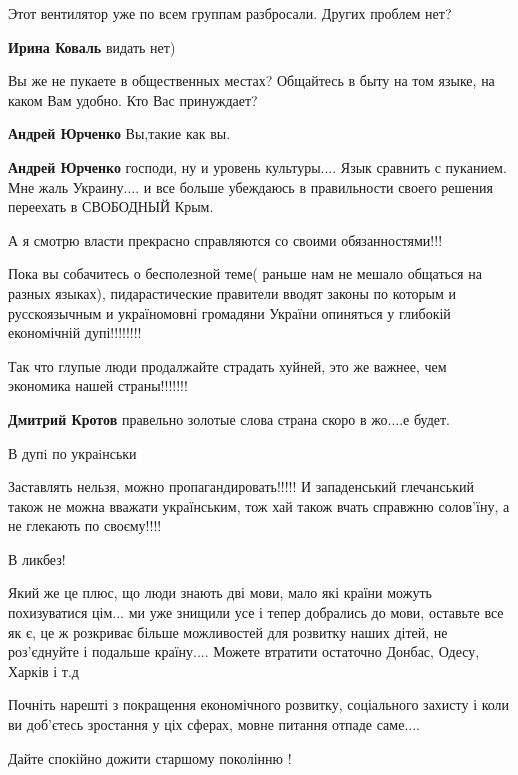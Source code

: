 \begin{itemize}
Этот вентилятор уже по всем группам разбросали. Других проблем нет?

\textbf{Ирина Коваль} видать нет)

Вы же не пукаете в общественных местах? Общайтесь в быту на том языке, на каком Вам удобно. Кто Вас принуждает?

\textbf{Андрей Юрченко} Вы,такие как вы.

\textbf{Андрей Юрченко} господи, ну и уровень культуры.... Язык сравнить с
пуканием. Мне жаль Украину.... и все больше убеждаюсь в правильности своего
решения переехать в СВОБОДНЫЙ Крым.


А я смотрю власти прекрасно справляются со своими обязанностями!!!

Пока вы собачитесь о бесполезной теме( раньше нам не мешало общаться на разных
языках), пидарастические правители вводят законы по которым и русскоязычным и
україномовні громадяни України опиняться у глибокій економічній дупі!!!!!!!!

Так что глупые люди продалжайте страдать хуйней, это же важнее, чем экономика
нашей страны!!!!!!!

\textbf{Дмитрий Кротов} правельно золотые слова страна скоро в жо....е будет.


В дупi по украiнськи

Заставлять нельзя, можно пропагандировать!!!!!
И западенський глечанський також не можна вважати українським, тож хай також вчать справжню солов'їну, а не глекають по своєму!!!!

В ликбез!


Який же це плюс, що люди знають дві мови, мало які країни можуть похизуватися
цім... ми уже знищили усе і тепер добрались до мови, оставьте все як є, це ж
розкриває більше можливостей для розвитку наших дітей, не роз'єднуйте і
подальше країну.... Можете втратити остаточно Донбас, Одесу, Харків і т.д

Почніть нарешті з покращення економічного розвитку, соціального захисту і коли
ви доб'єтесь зростання у ціх сферах, мовне питання отпаде саме....

Дайте спокійно дожити старшому поколінню !




\end{itemize}
